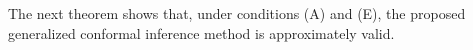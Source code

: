 \documentclass[final,12pt]{colt2018} %
\newcommand{\yinchu}[1]{\textcolor{teal}{Yinchu: #1}}
\newcommand{\KW}[1]{\textcolor{cyan}{KW: #1}}
\begin{document}
The next theorem shows that, under conditions (A) and (E), the proposed generalized conformal inference method is approximately valid. 









\end{document}
